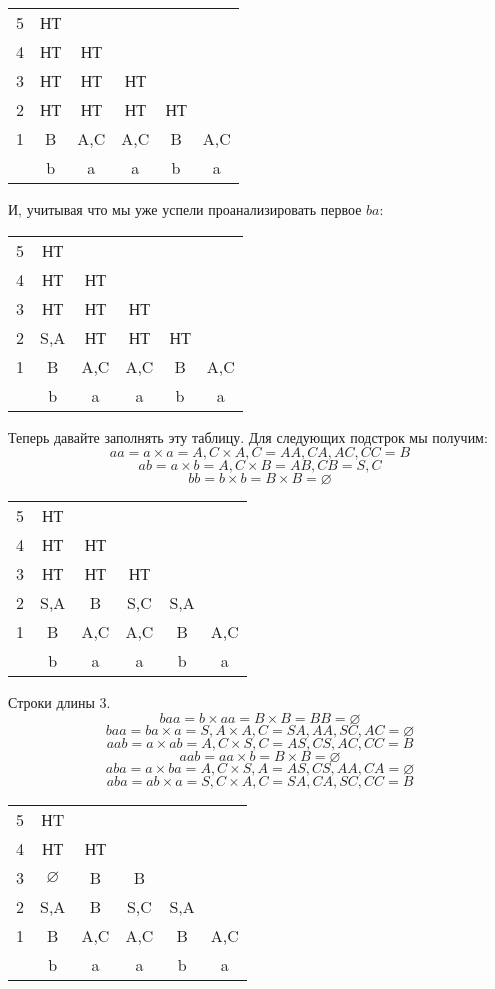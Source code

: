 \documentclass{article}
\begin{document}
\begin{center}
    \begin{tabular}{ c|c c c c c }
    5 & НТ  \\ 
    4 & НТ & НТ   \\  
    3 & НТ & НТ & НТ   \\  
    2 & НТ & НТ & НТ & НТ  \\  
    1 & B & A,C & A,C & B & A,C  \\
    \hline
      & b  &  a &  a & b  &  a 
    \end{tabular}
\end{center}
И, учитывая что мы уже успели проанализировать первое $ba$:
\begin{center}
    \begin{tabular}{ c|c c c c c }
    5 & НТ  \\ 
    4 & НТ & НТ   \\  
    3 & НТ & НТ & НТ   \\  
    2 & S,A & НТ & НТ & НТ  \\  
    1 & B & A,C & A,C & B & A,C  \\
    \hline
      & b  &  a &  a & b  &  a 
    \end{tabular}
\end{center}
Теперь давайте заполнять эту таблицу. Для следующих подстрок мы получим:
$$aa = a\times a = A,C \times A,C = AA, CA, AC, CC = B$$
$$ab = a\times b = A,C \times B = AB, CB = S, C$$
$$bb = b\times b = B \times B = \varnothing$$
\begin{center}
    \begin{tabular}{ c|c c c c c }
    5 & НТ \\ 
    4 & НТ & НТ   \\  
    3 & НТ & НТ & НТ   \\  
    2 & S,A & B & S,C & S,A  \\  
    1 & B & A,C & A,C & B & A,C  \\
    \hline
      & b  &  a &  a & b  &  a 
    \end{tabular}
\end{center}
Строки длины 3.
$$baa = b\times aa = B \times B = BB = \varnothing$$
$$baa = ba\times a = S,A \times A,C = SA, AA, SC, AC = \varnothing$$
$$aab = a\times ab = A,C \times S,C = AS, CS, AC, CC = B$$
$$aab = aa\times b = B \times B = \varnothing$$
$$aba = a\times ba = A,C \times S,A = AS, CS, AA, CA = \varnothing$$
$$aba = ab\times a = S,C \times A,C = SA, CA, SC, CC = B$$
\begin{center}
    \begin{tabular}{ c|c c c c c }
    5 & НT \\ 
    4 & НТ & НТ   \\  
    3 & $\varnothing$ & B & B   \\  
    2 & S,A & B & S,C & S,A  \\  
    1 & B & A,C & A,C & B & A,C  \\
    \hline
      & b  &  a &  a & b  &  a 
    \end{tabular}
\end{center}
\end{document}
